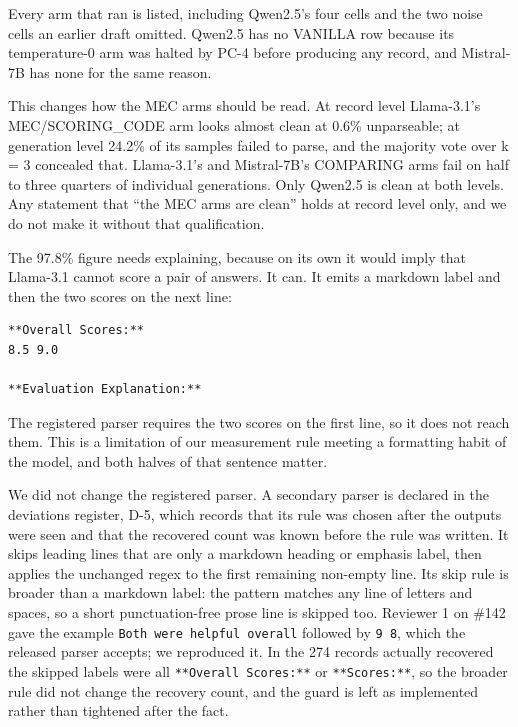 Every arm that ran is listed, including Qwen2.5's four cells and the two noise cells an earlier
draft omitted. Qwen2.5 has no VANILLA row because its temperature-0 arm was halted by PC-4 before
producing any record, and Mistral-7B has none for the same reason.

This changes how the MEC arms should be read. At record level Llama-3.1's MEC/SCORING\_CODE arm looks
almost clean at 0.6\% unparseable; at generation level 24.2\% of its samples failed to parse, and the
majority vote over k = 3 concealed that. Llama-3.1's and Mistral-7B's COMPARING arms fail on half to
three quarters of individual generations. Only Qwen2.5 is clean at both levels. Any statement that
``the MEC arms are clean'' holds at record level only, and we do not make it without that
qualification.

The 97.8\% figure needs explaining, because on its own it would imply that Llama-3.1 cannot score a
pair of answers. It can. It emits a markdown label and then the two scores on the next line:

\begin{verbatim}
**Overall Scores:**
8.5 9.0

**Evaluation Explanation:**
\end{verbatim}

The registered parser requires the two scores on the first line, so it does not reach them. This is
a limitation of our measurement rule meeting a formatting habit of the model, and both halves of
that sentence matter.

We did not change the registered parser. A secondary parser is declared in the deviations register, D-5, which
records that its rule was chosen after the outputs were seen and that the recovered count was known
before the rule was written. It skips leading lines that are only a markdown heading or emphasis
label, then applies the unchanged regex to the first remaining non-empty line. Its skip rule is broader than a markdown label: the pattern matches any line of letters and spaces, so a
short punctuation-free prose line is skipped too. Reviewer 1 on \#142 gave the example \texttt{Both\ were\ helpful\ overall} followed by \texttt{9\ 8}, which the released parser accepts; we reproduced it. In the 274
records actually recovered the skipped labels were all \texttt{**Overall\ Scores:**} or \texttt{**Scores:**}, so
the broader rule did not change the recovery count, and the guard is left as implemented rather
than tightened after the fact.

